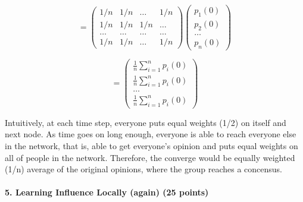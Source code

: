 \documentclass[11pt]{article} %
\begin{document}
\begin{itemize}
$$=\left( \begin{array}{cccc}
1/n & 1/n &  \hdots & 1/n \\
1/n & 1/n & 1/n & \hdots   \\ 
\hdots & \hdots & \hdots & \hdots \\
1/n & 1/n &  \hdots & 1/n
\end{array}\right) 
\left( \begin{array}{c}
p_1(0) \\
p_2(0) \\
\hdots \\
p_n(0)
\end{array}\right)  $$

$$=
\left( \begin{array}{c}
\frac{1}{n} \sum_{i=1}^{n} p_i(0) \\
\frac{1}{n} \sum_{i=1}^{n} p_i(0)  \\
\hdots \\
\frac{1}{n} \sum_{i=1}^{n} p_i(0) 
\end{array}\right)  $$

Intuitively, at each time step, everyone puts equal weights (1/2) on itself and next node. As time goes on long enough, everyone is able to reach everyone else in the network, that is, able to get everyone's opinion and puts equal weights on all of people in the network. Therefore, the converge would be equally weighted (1/n) average of the original opinions, where the group reaches a concensus.

 \end{itemize}




























\paragraph{5. Learning Influence Locally (again) (25 points)}
 
\end{document}
